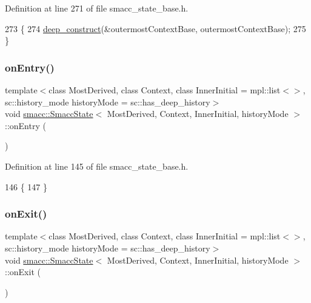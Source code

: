 Definition at line 271 of file smacc\+\_\+state\+\_\+base.\+h.


\begin{DoxyCode}
273     \{
274       \hyperlink{classsmacc_1_1SmaccState_aac23d8a6909f75c5e5fca2a7c09b5368}{deep\_construct}(&outermostContextBase, outermostContextBase);
275     \}
\end{DoxyCode}
\mbox{\label{classsmacc_1_1SmaccState_a4a10a74fdbe51a798b8d651668b8ed9a}} 
\subsubsection{\texorpdfstring{on\+Entry()}{onEntry()}}
{\footnotesize\ttfamily template$<$class Most\+Derived, class Context, class Inner\+Initial = mpl\+::list$<$$>$, sc\+::history\+\_\+mode history\+Mode = sc\+::has\+\_\+deep\+\_\+history$>$ \\
void \hyperlink{classsmacc_1_1SmaccState}{smacc\+::\+Smacc\+State}$<$ Most\+Derived, Context, Inner\+Initial, history\+Mode $>$\+::on\+Entry (\begin{DoxyParamCaption}{ }\end{DoxyParamCaption})\hspace{0.3cm}{\ttfamily [inline]}}



Definition at line 145 of file smacc\+\_\+state\+\_\+base.\+h.


\begin{DoxyCode}
146     \{
147     \}
\end{DoxyCode}
\mbox{\label{classsmacc_1_1SmaccState_a82ca7c69153e86dc5eedf3f909560f3a}} 
\subsubsection{\texorpdfstring{on\+Exit()}{onExit()}}
{\footnotesize\ttfamily template$<$class Most\+Derived, class Context, class Inner\+Initial = mpl\+::list$<$$>$, sc\+::history\+\_\+mode history\+Mode = sc\+::has\+\_\+deep\+\_\+history$>$ \\
void \hyperlink{classsmacc_1_1SmaccState}{smacc\+::\+Smacc\+State}$<$ Most\+Derived, Context, Inner\+Initial, history\+Mode $>$\+::on\+Exit (\begin{DoxyParamCaption}{ }\end{DoxyParamCaption})\hspace{0.3cm}{\ttfamily [inline]}}




